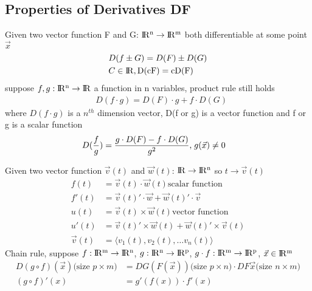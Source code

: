 \documentclass{article}
\newcommand{\R}{\rm I\!R}
\begin{document}
    \subsection{Properties of Derivatives DF}
        Given two vector function F and G: $\R^n\rightarrow\R^m$ both differentiable at some point $\vec{x}$
        \begin{align}
            &D(f\pm G) = D(F) \pm D(G)\\
            &C \in \R, D(cF) = cD(F)
        \end{align}
        suppose\; $f,g:\R^n\rightarrow\R $ a function in n variables, product rule still holds
        \begin{align}
            &D(f\cdot g) = D(F)\cdot g + f\cdot D(G)
        \end{align}
        where $D(f\cdot g)$ is a $n^{th}$ dimension vector, D(f or g) is a vector function and f or g is a scalar function
        \begin{align}
            &D(\frac{f}{g}) = \frac{g\cdot D(F) - f\cdot D(G)}{g^2}\text{,\;}g(\vec{x})\neq0
        \end{align}
        
        Given two vector function $\vec{v}(t)$ and $\vec{w}(t)$: $\R\rightarrow\R^n$ so $t\rightarrow\vec{v}(t)$
        \begin{align}
            f(t) &= \vec{v}(t) \cdot \vec{w}(t) \text{scalar function}\\
            f'(t)&= \vec{v}(t)' \cdot \vec{w} + \vec{w}(t)' \cdot \vec{v}\\
            u(t) &= \vec{v}(t) \times \vec{w}(t) \text{vector function}\\
            u'(t)&= \vec{v}(t)' \times \vec{w}(t) + \vec{w}(t)' \times \vec{v}(t)\\
            \vec{v}(t) &= \langle v_1(t), v_2(t), \dots v_n(t) \rangle
        \end{align}
        Chain rule, suppose $f:\R^m\rightarrow\R^n$, $g:\R^n\rightarrow\R^p$, $g\cdot f:\R^m\rightarrow\R^p$, $\vec{x}\in\R^m$
        \begin{align}
            D(g\circ f)(\vec{x})\text{(size $p\times m$)} &= DG(F(\vec{x}))\text{(size $p\times n$)}\cdot DF\vec{x}\text{(size $n\times m$)}\\
            (g\circ f)'(x) &= g'(f(x))\cdot f'(x)
        \end{align}
        
\end{document}
